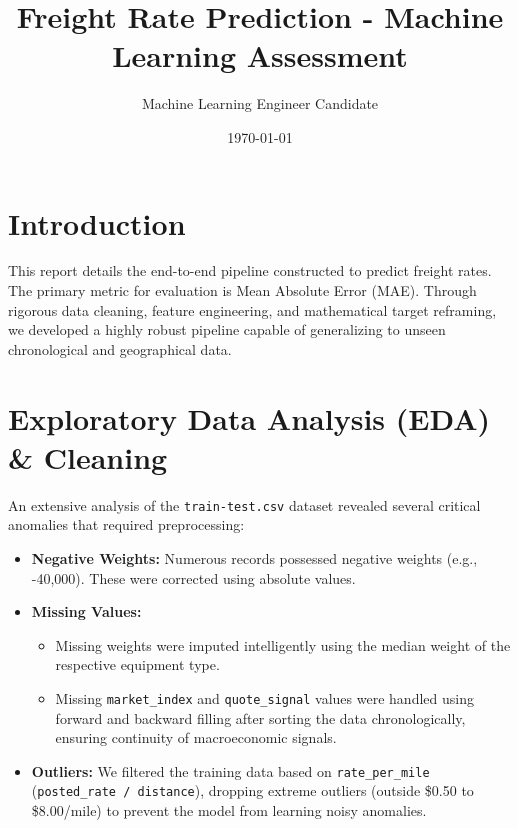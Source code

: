 \documentclass{article}
\title{\textbf{Freight Rate Prediction - Machine Learning Assessment}}
\author{Machine Learning Engineer Candidate}
\date{\today}
\begin{document}
\maketitle

\section{Introduction}
This report details the end-to-end pipeline constructed to predict freight rates. The primary metric for evaluation is Mean Absolute Error (MAE). Through rigorous data cleaning, feature engineering, and mathematical target reframing, we developed a highly robust pipeline capable of generalizing to unseen chronological and geographical data.

\section{Exploratory Data Analysis (EDA) \& Cleaning}
An extensive analysis of the \texttt{train-test.csv} dataset revealed several critical anomalies that required preprocessing:
\begin{itemize}
    \item \textbf{Negative Weights:} Numerous records possessed negative weights (e.g., -40,000). These were corrected using absolute values.
    \item \textbf{Missing Values:} 
    \begin{itemize}
        \item Missing weights were imputed intelligently using the median weight of the respective equipment type.
        \item Missing \texttt{market\_index} and \texttt{quote\_signal} values were handled using forward and backward filling after sorting the data chronologically, ensuring continuity of macroeconomic signals.
    \end{itemize}
    \item \textbf{Outliers:} We filtered the training data based on \texttt{rate\_per\_mile} (\texttt{posted\_rate / distance}), dropping extreme outliers (outside \$0.50 to \$8.00/mile) to prevent the model from learning noisy anomalies.
\end{itemize}
\end{document}
